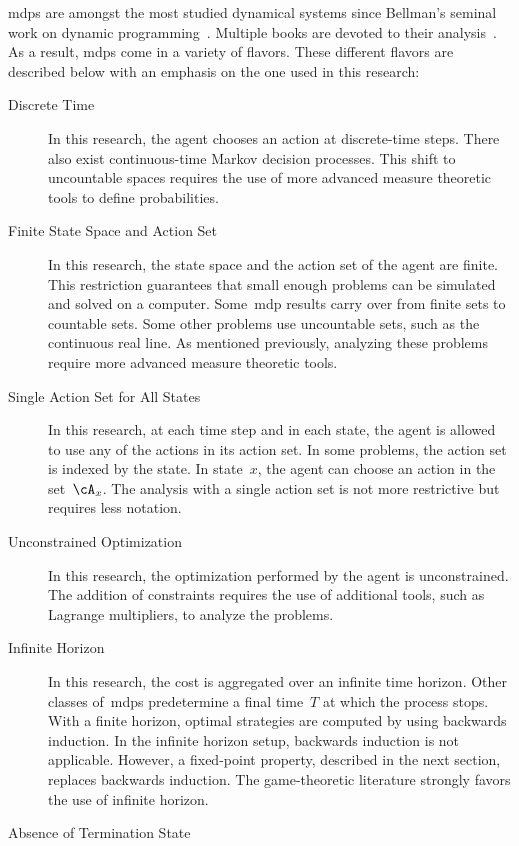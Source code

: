 \begin{note}
\Acp{mdp} are amongst the most studied dynamical systems since Bellman's seminal work on dynamic programming~\cite{bellman:1957}.
Multiple books are devoted to their analysis~\cite{puterman:1994,bertsekas:1995}.
As a result, \acp{mdp} come in a variety of flavors.
These different flavors are described below with an emphasis on the one used in this research:
\begin{description}
\item[Discrete Time]
In this research, the agent chooses an action at discrete-time steps.
There also exist continuous-time Markov decision processes.
This shift to uncountable spaces requires the use of more advanced measure theoretic tools to define probabilities.
\item[Finite State Space and Action Set]
In this research, the state space and the action set of the agent are finite.
This restriction guarantees that small enough problems can be simulated and solved on a computer.
Some~\ac{mdp} results carry over from finite sets to countable sets.
Some other problems use uncountable sets, such as the continuous real line.
As mentioned previously, analyzing these problems require more advanced measure theoretic tools.
\item[Single Action Set for All States]
In this research, at each time step and in each state, the agent is allowed to use any of the actions in its action set.
In some problems, the action set is indexed by the state.
In state~\(x\), the agent can choose an action in the set~\(\cA\strat{x}\).
The analysis with a single action set is not more restrictive but requires less notation.
\item[Unconstrained Optimization]
In this research, the optimization performed by the agent is unconstrained.
The addition of constraints requires the use of additional tools, such as Lagrange multipliers, to analyze the problems.
\item[Infinite Horizon]
In this research, the cost is aggregated over an infinite time horizon.
Other classes of~\acp{mdp} predetermine a final time~\(T\) at which the process stops.
With a finite horizon, optimal strategies are computed by using backwards induction.
In the infinite horizon setup, backwards induction is not applicable.
However, a fixed-point property, described in the next section, replaces backwards induction.
The game-theoretic literature strongly favors the use of infinite horizon.
\item[Absence of Termination State]

\end{description}
\end{note}
